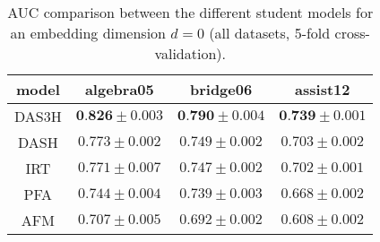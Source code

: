 \begin{table}
\setlength{\abovecaptionskip}{4mm}
\centering
\begin{tabular}{cccc}
\toprule
                      model &  algebra05 & bridge06 & assist12 \\
\midrule
\alert{DAS3H} & $\textbf{0.826} \pm 0.003$ &  $\textbf{0.790} \pm 0.004$ & $\textbf{0.739} \pm 0.001$ \\
DASH & $0.773 \pm 0.002$ & $0.749 \pm 0.002$ & $0.703 \pm 0.002$ \\
IRT & $0.771 \pm 0.007$ & $0.747 \pm 0.002$ & $0.702 \pm 0.001$ \\
PFA & $0.744 \pm 0.004$ & $0.739 \pm 0.003$ & $0.668 \pm 0.002$ \\
AFM & $0.707 \pm 0.005$ & $0.692 \pm 0.002$ & $0.608 \pm 0.002$ \\
\bottomrule
\end{tabular}
\caption{AUC comparison between the different student models for an embedding dimension $d=0$ (all datasets, 5-fold cross-validation).}
\label{all_res}
\end{table}